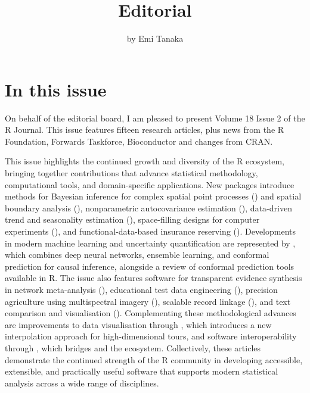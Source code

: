 \title{Editorial}


\author{by Emi Tanaka}

\maketitle


\section*{In this issue}\label{in-this-issue}

On behalf of the editorial board, I am pleased to present Volume 18 Issue 2 of the R Journal. This issue features fifteen research articles, plus news from the R Foundation, Forwards Taskforce, Bioconductor and changes from CRAN.

This issue highlights the continued growth and diversity of the R ecosystem, bringing together contributions that advance statistical methodology, computational tools, and domain-specific applications. New packages introduce methods for Bayesian inference for complex spatial point processes () and spatial boundary analysis (), nonparametric autocovariance estimation (), data-driven trend and seasonality estimation (), space-filling designs for computer experiments (), and functional-data-based insurance reserving (). Developments in modern machine learning and uncertainty quantification are represented by , which combines deep neural networks, ensemble learning, and conformal prediction for causal inference, alongside a review of conformal prediction tools available in R. The issue also features software for transparent evidence synthesis in network meta-analysis (), educational test data engineering (), precision agriculture using multispectral imagery (), scalable record linkage (), and text comparison and visualisation (). Complementing these methodological advances are improvements to data visualisation through , which introduces a new interpolation approach for high-dimensional tours, and software interoperability through , which bridges  and the  ecosystem. Collectively, these articles demonstrate the continued strength of the R community in developing accessible, extensible, and practically useful software that supports modern statistical analysis across a wide range of disciplines.


